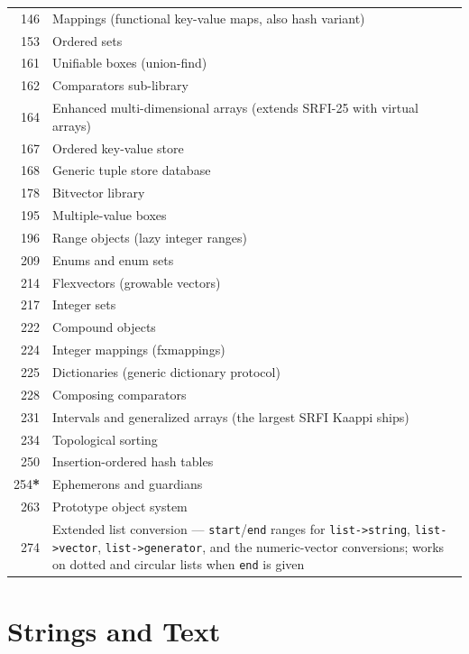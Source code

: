 \begin{longtable}{rp{9cm}}
146 & Mappings (functional key-value maps, also hash variant) \\
153 & Ordered sets \\
161 & Unifiable boxes (union-find) \\
162 & Comparators sub-library \\
164 & Enhanced multi-dimensional arrays (extends SRFI-25 with virtual arrays) \\
167 & Ordered key-value store \\
168 & Generic tuple store database \\
178 & Bitvector library \\
195 & Multiple-value boxes \\
196 & Range objects (lazy integer ranges) \\
209 & Enums and enum sets \\
214 & Flexvectors (growable vectors) \\
217 & Integer sets \\
222 & Compound objects \\
224 & Integer mappings (fxmappings) \\
225 & Dictionaries (generic dictionary protocol) \\
228 & Composing comparators \\
231 & Intervals and generalized arrays (the largest SRFI Kaappi ships) \\
234 & Topological sorting \\
250 & Insertion-ordered hash tables \\
254\textbf{*} & Ephemerons and guardians \\
263 & Prototype object system \\
274 & Extended list conversion --- \texttt{start}/\texttt{end} ranges for \texttt{list->string}, \texttt{list->vector}, \texttt{list->generator}, and the numeric-vector conversions; works on dotted and circular lists when \texttt{end} is given \\
\end{longtable}

\section{Strings and Text}


